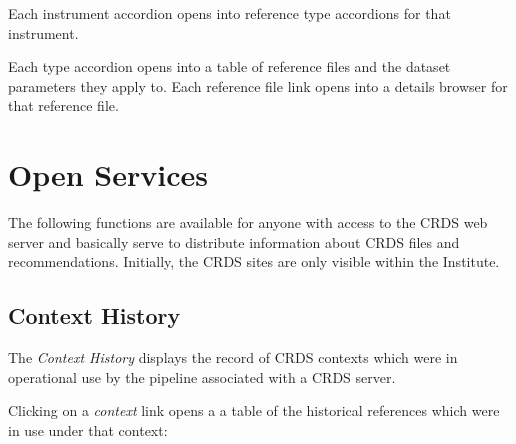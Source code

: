 \documentclass[letterpaper,10pt,english]{sphinxmanual}
\begin{document}
Each instrument accordion opens into reference type accordions for that instrument.

Each type accordion opens into a table of reference files and the dataset parameters
they apply to.   Each reference file link opens into a details browser for that reference
file.


\section{Open Services}
\label{web_site_use:open-services}
The following functions are available for anyone with access to the CRDS web
server and basically serve to distribute information about CRDS files and
recommendations.   Initially,  the CRDS sites are only visible within the Institute.


\subsection{Context History}
\label{web_site_use:context-history}
The \emph{Context History} displays the record of CRDS contexts which were in operational use by
the pipeline associated with a CRDS server.
\begin{figure}[htbp]
\centering

\end{figure}

Clicking on a \emph{context} link opens a a table of the historical references which were in use under
that context:
\begin{figure}[htbp]
\centering

\end{figure}
\end{document}
